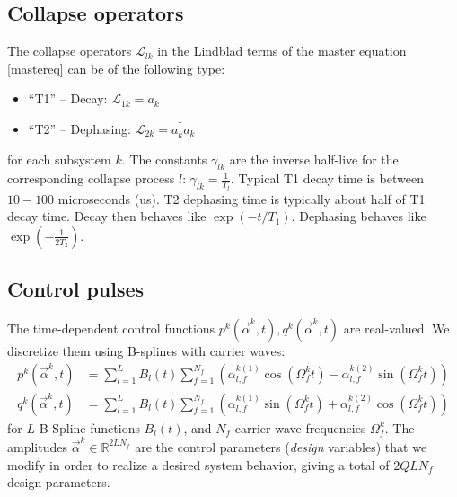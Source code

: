 \documentclass[letterpaper]{article}
\newcommand{\Ell}{\mathcal{L}}
\newcommand{\R}{\mathds{R}}
\begin{document}
\subsection{Collapse operators}
The collapse operators $\Ell_{lk}$ in the Lindblad terms of the master equation \eqref{mastereq} can be of the following type:
\begin{itemize}
  \item ``T1'' -- Decay: $\Ell_{1k} = a_k$
  \item ``T2'' -- Dephasing: $\Ell_{2k} = a_k^{\dagger}a_k$
\end{itemize}
for each subsystem $k$. The constants $\gamma_{lk}$ are the inverse half-live for the corresponding collapse process $l$: $\gamma_{lk} = {\frac{1}{T_l}}$. Typical T1 decay time is between $10-100$ microseconds (us). T2 dephasing time is typically about half of T1 decay time. Decay then behaves like $\exp(-t/{T_1})$. Dephasing behaves like $\exp(-\frac{1}{2{T_2}})$.

\subsection{Control pulses}
The time-dependent control functions $p^k(\vec{\alpha}^k,t), q^k(\vec{\alpha}^k,t)$ are real-valued. We discretize them using B-splines with carrier waves:
\begin{align}
  p^k(\vec{\alpha}^k,t) &= \sum_{l=1}^L B_l(t) \sum_{f=1}^{N_f} \left(\alpha^{k (1)}_{l,f} \cos(\Omega_f^k t) - \alpha^{k (2)}_{l,f} \sin(\Omega_f^k t) \right) \\
  q^k(\vec{\alpha}^k,t) &= \sum_{l=1}^L B_l(t) \sum_{f=1}^{N_f} \left( \alpha^{k (1)}_{l,f} \sin(\Omega_f^k t) + \alpha^{k (2)}_{l,f} \cos(\Omega_f^k t) \right)
\end{align}
for $L$ B-Spline functions $B_l(t)$, and $N_f$ carrier wave frequencies $\Omega_f^k$. The amplitudes $\vec{\alpha}^k \in \R^{2LN_f}$ are the control parameters (\textit{design} variables) that we modify in order to realize a desired system behavior, giving a total of $2QLN_f$ design parameters.
\end{document}
